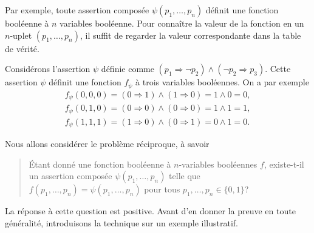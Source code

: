 \documentclass[french,course,oneside,theoremnosection]{lecture}
\newcommand{\iimplies}{\Rightarrow}
\begin{document}
Par exemple, toute assertion composée $\psi(p_1, \ldots, p_n)$ définit une fonction booléenne à $n$ variables booléenne. Pour connaître la valeur de la fonction en un $n$-uplet $(p_1, \ldots, p_n)$, il suffit de regarder la valeur correspondante dans la table de vérité.

\begin{example}
Considérons l'assertion $\psi$ définie comme $(p_1 \iimplies \neg p_2) \wedge (\neg p_2 \iimplies p_3)$. Cette assertion $\psi$ définit une fonction $f_\psi$ à trois variables booléennes. On a par exemple
\begin{align*}
f_\psi(0,0,0) = (0 \iimplies 1) \wedge (1 \iimplies 0) = 1 \wedge 0 = 0,\\
f_\psi(0,1,0) = (0 \iimplies 0) \wedge (0 \iimplies 0) = 1 \wedge 1 = 1,\\
f_\psi(1,1,1) = (1 \iimplies 0) \wedge (0 \iimplies 1) = 0 \wedge 1 = 0.
\end{align*}
\end{example}

Nous allons considérer le problème réciproque, à savoir
\begin{quotation}
Étant donné une fonction booléenne à $n$-variables booléennes $f$, existe-t-il un assertion composée $\psi(p_1, \ldots, p_n)$ telle que $f(p_1, \ldots, p_n) = \psi(p_1, \ldots, p_n)$ pour tous $p_1, \ldots, p_n \in \{0,1\}$?
\end{quotation}

La réponse à cette question est positive. Avant d'en donner la preuve en toute généralité, introduisons la technique sur un exemple illustratif.
\end{document}

